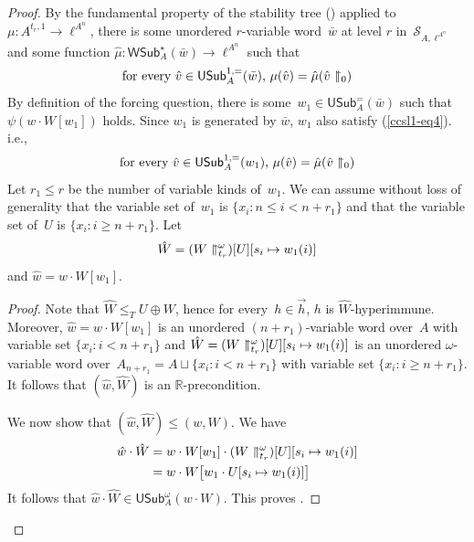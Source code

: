 \documentclass{article}
\def\RR{\mathbb{R}}
\def\Sc{\mathcal{S}}
\newcommand{\USub}{\mathsf{USub}}
\newcommand{\WSub}{\mathsf{WSub}}
\numberwithin{theorem}{section}
\newtheorem{claim}{Claim}
\theoremstyle{definition}
\newcommand{\upupharpoonright}{%
  \upharpoonright
  \mathrel{\mkern-4.5mu}%
  \upharpoonright
}
\newcommand{\uuh}{\upupharpoonright}
\begin{document}
\begin{proof}
By the fundamental property of the stability tree () applied to $\mu : A^{t_r,1} \to \ell^{A^n}$, there is some unordered $r$-variable word~$\bar w$ at level $r$ in~$\Sc_{A,\ell^{A^n}}$ and some function $\hat \mu : \WSub^\star_A(\bar w) \to \ell^{A^n}$ such that
\begin{align}\label{ccsl1-eq4}
   \text{for every $\hat v \in \USub^{1,=}_A(\bar w)$, $\mu(\hat v) = \hat \mu(\hat v \uuh_0)$}
\end{align}
By definition of the forcing question, there is some~$w_1 \in \USub^=_A(\bar w)$ such that $\psi(w \cdot W[w_1])$ holds. 
Since $w_1$ is generated by $\bar w$, $w_1$ also satisfy (\ref{ccsl1-eq4}). i.e.,
\begin{align}\label{ccsl1-eq40}
   \text{for every $\hat v \in \USub^{1,=}_A(w_1)$, $\mu(\hat v) = \hat \mu(\hat v \uuh_0)$}
\end{align}
Let $r_1 \leq r$ be the number of variable kinds of~$w_1$. We can assume without loss of generality that the variable set of~$w_1$ is $\{ x_i : n \leq i < n+r_1 \}$ and that the variable set of~$U$ is $\{ x_i : i \geq n+r_1 \}$.
Let $$\hat W = (W \uuh_{t_r}^\omega)[U][s_i \mapsto w_1(i)]$$ and $\hat w = w \cdot W[w_1]$.
\begin{proof}
Note that $\hat W \leq_T U \oplus W$, hence for every~$h \in \vec{h}$, $h$ is $\hat W$-hyperimmune.
Moreover, $\hat w = w \cdot W[w_1]$ is an unordered $(n+r_1)$-variable word over~$A$ with variable set $\{x_i : i < n+r_1 \}$ and $\hat W = (W \uuh_{t_r}^\omega)[U][s_i \mapsto w_1(i)]$ is an unordered $\omega$-variable word over~$A_{n+r_1} = A \sqcup \{ x_i : i < n + r_1 \}$ with variable set $\{ x_i : i \geq n+r_1 \}$. It follows that $(\hat w, \hat W)$ is an $\RR$-precondition.

We now show that $(\hat w, \hat W) \leq (w, W)$. We have
\begin{align*}
\hat w \cdot \hat W &= w \cdot W[w_1] \cdot (W \uuh_{t_r}^\omega)[U][s_i \mapsto w_1(i)]\\
 &= w \cdot W\big[w_1 \cdot U[s_i \mapsto w_1(i)]\big]
\end{align*}
It follows that $\hat w \cdot \hat W \in \USub^\omega_A(w \cdot W)$.
This proves .
\end{proof}


\end{proof}
\end{document}
